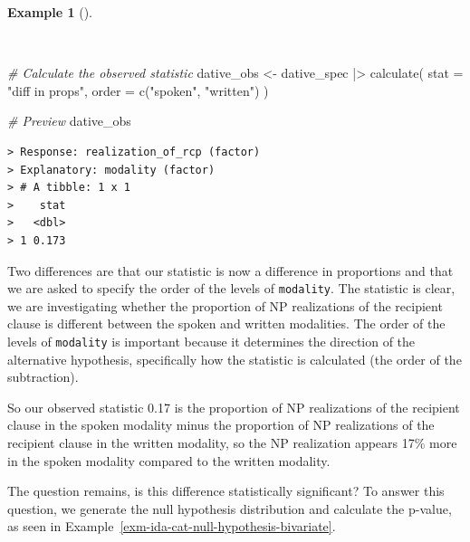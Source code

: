 \documentclass[
  letterpaper,
]{latex/krantz}
\newenvironment{Shaded}{\begin{snugshade}}{\end{snugshade}}
\newcommand{\AttributeTok}[1]{\textcolor[rgb]{0.00,0.00,0.00}{#1}}
\newcommand{\CommentTok}[1]{\textcolor[rgb]{0.00,0.00,0.00}{\textit{#1}}}
\newcommand{\FunctionTok}[1]{\textcolor[rgb]{0.00,0.00,0.00}{#1}}
\newcommand{\NormalTok}[1]{\textcolor[rgb]{0.00,0.00,0.00}{#1}}
\newcommand{\OtherTok}[1]{\textcolor[rgb]{0.00,0.00,0.00}{#1}}
\newcommand{\SpecialCharTok}[1]{\textcolor[rgb]{0.00,0.00,0.00}{#1}}
\newcommand{\StringTok}[1]{\textcolor[rgb]{0.00,0.00,0.00}{#1}}
\theoremstyle{definition}
\newtheorem{example}{Example}[chapter]
\theoremstyle{remark}
\begin{document}
\begin{example}[]\protect\hypertarget{exm-ida-cat-calculate-bivariate}{}\label{exm-ida-cat-calculate-bivariate}

~

\begin{Shaded}
\begin{Highlighting}[]
\CommentTok{\# Calculate the observed statistic}
\NormalTok{dative\_obs }\OtherTok{\textless{}{-}}
\NormalTok{  dative\_spec }\SpecialCharTok{|\textgreater{}}
  \FunctionTok{calculate}\NormalTok{(}
    \AttributeTok{stat =} \StringTok{"diff in props"}\NormalTok{,}
    \AttributeTok{order =} \FunctionTok{c}\NormalTok{(}\StringTok{"spoken"}\NormalTok{, }\StringTok{"written"}\NormalTok{)}
\NormalTok{  )}

\CommentTok{\# Preview}
\NormalTok{dative\_obs}
\end{Highlighting}
\end{Shaded}

\begin{verbatim}
> Response: realization_of_rcp (factor)
> Explanatory: modality (factor)
> # A tibble: 1 x 1
>    stat
>   <dbl>
> 1 0.173
\end{verbatim}

\end{example}

Two differences are that our statistic is now a difference in
proportions and that we are asked to specify the order of the levels of
\texttt{modality}. The statistic is clear, we are investigating whether
the proportion of NP realizations of the recipient clause is different
between the spoken and written modalities. The order of the levels of
\texttt{modality} is important because it determines the direction of
the alternative hypothesis, specifically how the statistic is calculated
(the order of the subtraction).

So our observed statistic 0.17 is the proportion of NP realizations of
the recipient clause in the spoken modality minus the proportion of NP
realizations of the recipient clause in the written modality, so the NP
realization appears 17\% more in the spoken modality compared to the
written modality.

The question remains, is this difference statistically significant? To
answer this question, we generate the null hypothesis distribution and
calculate the p-value, as seen in
Example~\ref{exm-ida-cat-null-hypothesis-bivariate}.
\end{document}
